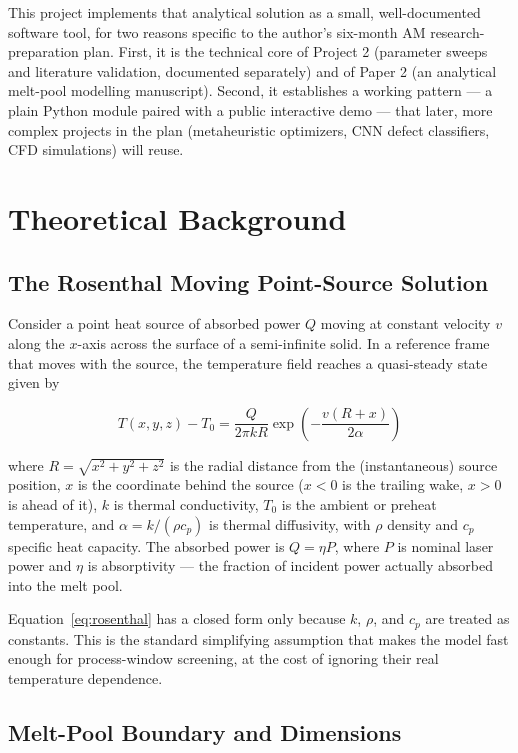 \documentclass[10pt,journal]{IEEEtran}
\begin{document}
This project implements that analytical solution as a small, well-documented software tool, for two reasons specific to the author's six-month AM research-preparation plan. First, it is the technical core of Project 2 (parameter sweeps and literature validation, documented separately) and of Paper 2 (an analytical melt-pool modelling manuscript). Second, it establishes a working pattern --- a plain Python module paired with a public interactive demo --- that later, more complex projects in the plan (metaheuristic optimizers, CNN defect classifiers, CFD simulations) will reuse.

\section{Theoretical Background}

\subsection{The Rosenthal Moving Point-Source Solution}

Consider a point heat source of absorbed power $Q$ moving at constant velocity $v$ along the $x$-axis across the surface of a semi-infinite solid. In a reference frame that moves with the source, the temperature field reaches a quasi-steady state given by

\begin{equation}
T(x,y,z) - T_0 = \frac{Q}{2\pi k R}\exp\!\left(-\frac{v(R+x)}{2\alpha}\right)
\label{eq:rosenthal}
\end{equation}

where $R = \sqrt{x^2+y^2+z^2}$ is the radial distance from the (instantaneous) source position, $x$ is the coordinate behind the source ($x<0$ is the trailing wake, $x>0$ is ahead of it), $k$ is thermal conductivity, $T_0$ is the ambient or preheat temperature, and $\alpha = k/(\rho c_p)$ is thermal diffusivity, with $\rho$ density and $c_p$ specific heat capacity. The absorbed power is $Q = \eta P$, where $P$ is nominal laser power and $\eta$ is absorptivity --- the fraction of incident power actually absorbed into the melt pool.

Equation~\ref{eq:rosenthal} has a closed form only because $k$, $\rho$, and $c_p$ are treated as constants. This is the standard simplifying assumption that makes the model fast enough for process-window screening, at the cost of ignoring their real temperature dependence.

\subsection{Melt-Pool Boundary and Dimensions}
\end{document}
